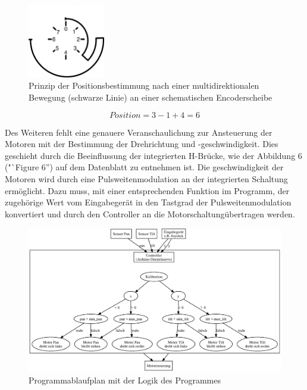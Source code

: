 \documentclass[a4paper, 12pt, bibliography=totocnumbered, listof=numbered]{scrartcl}
\begin{document}
	\begin{figure}[htb]
		\centering
		\includegraphics[width=0.3\textwidth]{Bilder/Positionsbestimmung}
		\caption{Prinzip der Positionsbestimmung nach einer multidirektionalen Bewegung (schwarze Linie) an einer schematischen Encoderscheibe}
		\label{Positionsbestimmung}
	\end{figure}

	\begin{equation}
		Position = 3 - 1 + 4 = 6
	\end{equation}

Des Weiteren fehlt eine genauere Veranschaulichung zur Ansteuerung der Motoren mit der Bestimmung der Drehrichtung und -geschwindigkeit. Dies geschieht durch die Beeinflussung der integrierten H-Brücke, wie der Abbildung 6 ("`Figure 6'') auf dem Datenblatt \cite{l298} zu entnehmen ist. Die geschwindigkeit der Motoren wird durch eine Pulsweitenmodulation an der integrierten Schaltung ermöglicht. Dazu muss, mit einer entsprechenden Funktion im Programm, der zugehörige Wert vom Eingabegerät in den Tastgrad\cite{wikipedia-tastgrad} der Pulsweitenmodulation konvertiert und durch den Controller an die Motorschaltungübertragen werden. 

	\begin{figure}[htb]
		\centering
		\includegraphics[scale=0.7,angle=90]{Bilder/Programmablaufplan}
		\caption{Programmablaufplan mit der Logik des Programmes}
		\label{Programmablaufplan}
	\end{figure}
\end{document}
